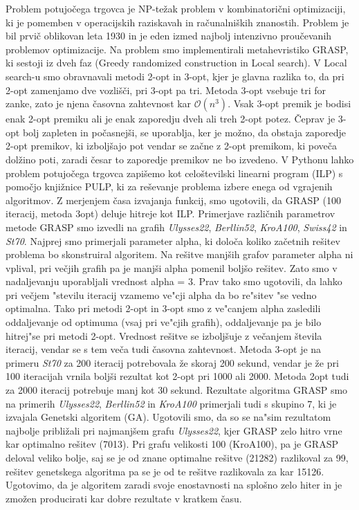 \documentclass[12pt,a4paper]{amsart}
\theoremstyle{definition} %
\theoremstyle{plain} %
\begin{document}
Problem potujočega trgovca je NP-težak problem v kombinatorični optimizaciji, ki je pomemben v operacijskih raziskavah in računalniških znanostih.  Problem je bil prvič oblikovan leta 1930 in je eden izmed najbolj intenzivno proučevanih problemov optimizacije. Na problem smo implementirali metahevristiko GRASP, ki sestoji iz dveh faz (Greedy randomized construction in Local search). V Local search-u smo obravnavali metodi 2-opt in 3-opt, kjer je glavna razlika to, da pri 2-opt zamenjamo dve vozlišči, pri 3-opt pa tri. Metoda 3-opt vsebuje tri for zanke, zato je njena časovna zahtevnost kar  $\mathcal{O}(n^3)$. Vsak 3-opt premik je bodisi enak 2-opt premiku ali je enak zaporedju dveh ali treh 2-opt potez. Čeprav je 3-opt bolj zapleten in počasnejši, se uporablja, ker je možno, da obstaja zaporedje 2-opt premikov, ki izboljšajo pot vendar se začne z 2-opt premikom, ki poveča dolžino poti, zaradi česar to zaporedje premikov ne bo izvedeno.  V Pythonu lahko problem potujočega trgovca zapišemo kot celoštevilski linearni program (ILP) s pomočjo knjižnice PULP, ki za reševanje problema izbere enega od vgrajenih algoritmov. Z merjenjem časa izvajanja funkcij, smo ugotovili, da GRASP (100 iteracij, metoda 3opt) deluje hitreje kot ILP.  Primerjave različnih parametrov metode GRASP smo izvedli na grafih \textit{Ulysses22}, \textit{Berllin52}, \textit{KroA100}, \textit{Swiss42} in \textit{St70}.  Najprej smo primerjali parameter alpha, ki določa koliko začetnih rešitev problema bo skonstruiral algoritem. Na rešitve manjših grafov parameter alpha ni vplival, pri večjih grafih pa je manjši alpha pomenil boljšo rešitev. Zato smo v nadaljevanju uporabljali vrednost alpha = 3. Prav tako smo ugotovili, da lahko pri večjem "stevilu iteracij vzamemo ve"cji alpha da bo re"sitev "se vedno optimalna. Tako pri metodi 2-opt in 3-opt smo z ve"canjem alpha zasledili oddaljevanje od optimuma (vsaj pri ve"cjih grafih), oddaljevanje pa je bilo hitrej"se pri metodi 2-opt. 
Vrednost rešitve se izboljšuje z večanjem števila iteracij, vendar se s tem veča tudi časovna zahtevnost. Metoda 3-opt je na primeru \textit{St70} za 200 iteracij potrebovala že skoraj 200 sekund, vendar je že pri 100 iteracijah vrnila boljši rezultat kot 2-opt pri 1000 ali 2000. Metoda 2opt tudi za 2000 iteracij potrebuje manj kot 30 sekund. Rezultate algoritma GRASP smo na primerih \textit{Ulysses22}, \textit{Berllin52} in \textit{KroA100} primerjali tudi s skupino 7, ki je izvajala Genetski algoritem (GA). Ugotovili smo, da so se na"sim rezultatom najbolje približali pri najmanjšem grafu \textit{Ulysses22}, kjer GRASP zelo hitro vrne kar optimalno rešitev (7013). Pri grafu velikosti 100 (KroA100), pa je GRASP deloval veliko bolje, saj se je od znane optimalne rešitve (21282) razlikoval za 99, rešitev genetskega algoritma pa se je od te rešitve razlikovala za kar 15126. Ugotovimo, da je algoritem zaradi svoje enostavnosti na splošno zelo hiter in je zmožen producirati kar dobre rezultate v kratkem času. 
\end{document}
